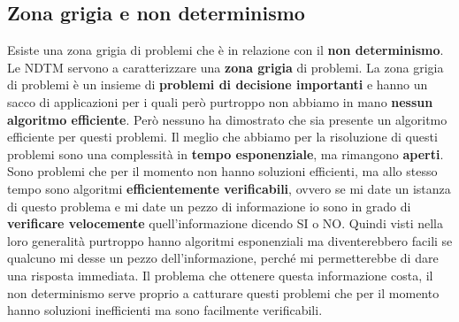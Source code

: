 \documentclass{article}
\begin{document}
\subsection{Zona grigia e non determinismo}
Esiste una zona grigia di problemi che è in relazione con il \textbf{non determinismo}.
Le NDTM servono a caratterizzare una \textbf{zona grigia} di problemi.
La zona grigia di problemi è un insieme di \textbf{problemi di decisione importanti} e hanno un sacco di applicazioni
per i quali però purtroppo non abbiamo in mano \textbf{nessun algoritmo efficiente}. Però nessuno ha dimostrato
che sia presente un algoritmo efficiente per questi problemi. Il meglio che abbiamo per la risoluzione
di questi problemi sono una complessità in \textbf{tempo esponenziale}, ma rimangono \textbf{aperti}.
\newline\newline
Sono problemi che per il momento non hanno soluzioni efficienti, ma allo stesso tempo sono algoritmi
\textbf{efficientemente verificabili}, ovvero se mi date un istanza di questo problema e mi date un
pezzo di informazione io sono in grado di \textbf{verificare velocemente} quell'informazione dicendo SI o NO.
\newline\newline
Quindi visti nella loro generalità purtroppo hanno algoritmi esponenziali ma diventerebbero facili se
qualcuno mi desse un pezzo dell'informazione, perché mi permetterebbe di dare una risposta immediata.
Il problema che ottenere questa informazione costa, il non determinismo serve proprio a catturare questi
problemi che per il momento hanno soluzioni inefficienti ma sono facilmente verificabili.
\end{document}
